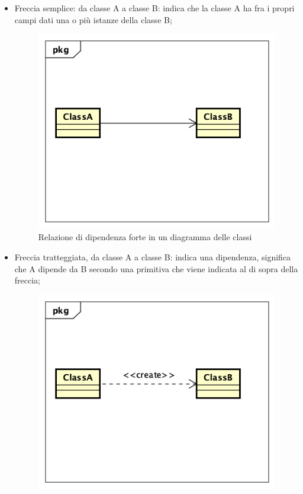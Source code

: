 \begin{itemize}
	\item Freccia semplice: da classe A a classe B: indica che la classe A ha fra i propri campi dati una o più istanze della classe B;
	\begin{figure}[h]
		\centering
		\includegraphics[scale=0.5]{images/Dipendenza.png}
		\caption{Relazione di dipendenza forte in un diagramma delle classi}\label{}
	\end{figure}
	\item Freccia tratteggiata, da classe A a classe B: indica una dipendenza, significa che A dipende da B secondo una primitiva che viene indicata al di sopra della freccia;
	\begin{figure}[h]
		\centering
		\includegraphics[scale=0.5]{images/Primitiva.png}

\end{figure}
\end{itemize}
